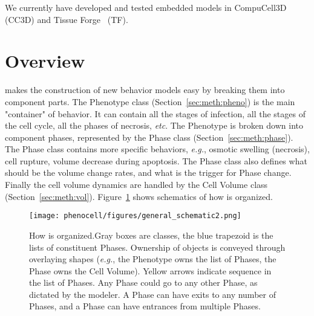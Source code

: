 We currently have developed and tested \pcps embedded models in CompuCell3D~\cite{swat_multi-scale_2012} (CC3D) and Tissue Forge~\cite{sego_tissue_2022} (TF). 



\section{\pcps Overview}\label{sec:meth}

\pcps makes the construction of new behavior models easy by breaking them into component parts. The Phenotype class (Section~\ref{sec:meth:pheno}) is the main  "container" 
of behavior. It can contain all the stages of infection, all the stages of the cell cycle, all the phases of necrosis, \textit{etc}. The Phenotype is broken down into component phases, represented by the Phase class (Section~\ref{sec:meth:phase}). The Phase class contains more specific behaviors, \textit{e.g.},  osmotic swelling (necrosis), cell rupture, volume decrease during apoptosis. The Phase class also defines what should be the volume change rates, and what is the trigger for Phase change. Finally the cell volume dynamics are handled by the Cell Volume class (Section~\ref{sec:meth:vol}). Figure~\ref{fig:schematics-general} shows schematics of how \pcps is organized.

\begin{figure}[!htbp]
    \centering
    \texttt{[image: phenocell/figures/general\_schematic2.png]} %
    \caption{How \pcp\space is organized.Gray boxes are \pcps classes, the blue trapezoid is the lists of constituent Phases. Ownership of objects is conveyed through overlaying shapes (\textit{e.g.}, the Phenotype owns the list of Phases, the Phase owns the Cell Volume). Yellow arrows indicate sequence in the list of Phases. Any Phase could go to any other Phase, as dictated by the modeler. A Phase can have exits to any number of Phases, and a Phase can have entrances from multiple Phases.}
    \label{fig:schematics-general}
\end{figure}

